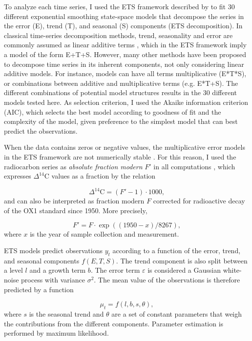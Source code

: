 \documentclass[a4paper, 11pt]{article}
\begin{document}
To analyze each time series, I used the ETS framework described by \citet{Hyndman2008} to fit 30 different exponential smoothing state-space models that decompose the series in the error (E), trend (T), and seasonal (S) components (ETS decomposition). In classical time-series decomposition methods, trend, seasonality and error are commonly assumed as linear additive terms \citep[e.g.][]{Cleveland1983}, which in the ETS framework imply a model of the form E+T+S. However, many other methods have been proposed to decompose time series in its inherent components, not only considering linear additive models. For instance, models can have all terms multiplicative (E*T*S), or combinations between additive and multiplicative terms (e.g. E*T+S). The different combinations of potential model structures results in the 30 different models tested here. As selection criterion, I used the Akaike information criterion (AIC), which selects the best model according to goodness of fit and the complexity of the model, given preference to the simplest model that can best predict the observations. 

When the data contains zeros or negative values, the multiplicative error models in the ETS framework are not numerically stable \citep{Hyndman2008}. For this reason, I used the radiocarbon series as \emph{absolute fraction modern} $F'$ in all computations \citep{Trumbore2016}, which expresses $\Delta^{14}$C values as a fraction by the relation

\begin{equation}
\Delta^{14} \text{C} = (F' -1) \cdot 1000,
\end{equation}
and can also be interpreted as fraction modern $F$ corrected for radioactive decay of the OX1 standard since 1950. More precisely, 

\begin{equation}
F' = F \cdot \exp((1950-x)/8267),
\end{equation}
where $x$ is the year of sample collection and measurement. 


ETS models predict observations $y_t$ according to a function of the error, trend, and seasonal components $f(E, T, S)$. The trend component is also split between a level $l$ and a growth term $b$. The error term $\varepsilon$ is considered a Gaussian white-noise process with variance $\sigma^2$. The mean value of the observations is therefore predicted by a function

\begin{equation}
\mu_t = f(l, b, s, \theta),
\end{equation}
where $s$ is the seasonal trend and $\theta$ are a set of constant parameters that weigh the contributions from the different components. Parameter estimation is performed by 
maximum likelihood. 
\end{document}
